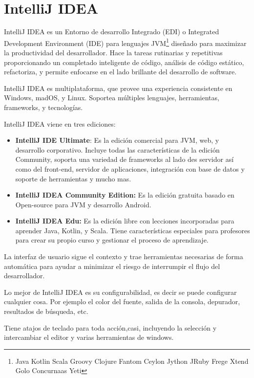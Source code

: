 \chapter*{IntelliJ IDEA}
IntelliJ IDEA es un Entorno de desarrollo Integrado (EDI) o Integrated Development Environment (IDE) para lenguajes JVM\footnote{Java
    Kotlin
    Scala
    Groovy
    Clojure
    Fantom
    Ceylon
    Jython
    JRuby
    Frege
    Xtend
    Golo
    Concurnaas
    Yeti } 
diseñado para maximizar la productividad del desarrollador. Hace la tareas rutinarias y repetitivas proporcionando un completado inteligente de código, análisis de código estático, refactoriza, y permite enfocarse en el lado brillante del desarrollo de software.

IntelliJ IDEA es multiplataforma, que provee una experiencia consistente en Windows, madOS, y Linux. 
Soportea múltiples lenguajes, herramientas, frameworks, y tecnologías. 

IntelliJ IDEA viene en tres ediciones:
\begin{itemize}
\item \textbf{IntelliJ IDE Ultimate}: Es la edición comercial para JVM, web, y desarrollo corporativo. Incluye todas las características de la edición Community, soporta una variedad de frameworks al lado des servidor así como del front-end, servidor de aplicaciones, integración con base de datos y soporte de herramientas y mucho mas. 
\item \textbf{IntelliJ IDEA Community Edition:} Es la edición gratuita basado en Open-source para JVM y desarrollo Android.
\item \textbf{IntelliJ IDEA Edu:} Es la edición libre con lecciones incorporadas para aprender Java, Kotlin, y Scala. Tiene características especiales para profesores para crear su propio curso y gestionar el proceso de aprendizaje. 
\end{itemize}

La interfaz de usuario sigue el contexto y trae herramientas necesarias de forma automática para ayudar a minimizar el riesgo de interrumpir el flujo del desarrollador. 

Lo mejor de IntelliJ IDEA es su configurabilidad, es decir se puede configurar cualquier cosa. Por ejemplo el color del fuente, salida de la consola, depurador, resultados de búsqueda, etc. 

Tiene atajos de teclado para toda acción,casi, incluyendo la selección y intercambiar el editor y varias herramientas de windows. 

